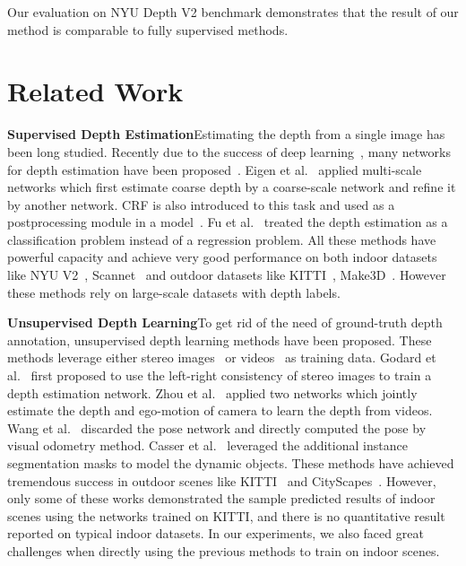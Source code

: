 \documentclass[10pt,twocolumn,letterpaper]{article}
\begin{document}
Our evaluation on NYU Depth V2 benchmark demonstrates that the result of our method is comparable to fully supervised methods. 

\section{Related Work}

\textbf{Supervised Depth Estimation}\quad Estimating the depth from a single image has been long studied. Recently due to the success of deep learning~\cite{li2019_internet,li2019_cmt}, many networks for depth estimation have been proposed~\cite{eigen2014depth,eigen2015predicting,li2017two,liu2014discrete,fu2018deep,laina2016deeper}. Eigen et al.~\cite{eigen2014depth} applied multi-scale networks which first estimate coarse depth by a coarse-scale network and refine it by another network. CRF is also introduced to this task and used as a postprocessing module in a model~\cite{xu2017multi}. Fu et al.~\cite{fu2018deep} treated the depth estimation as a classification problem instead of a regression problem. All these methods have powerful capacity and achieve very good performance on both indoor datasets like NYU V2~\cite{silberman2012indoor}, Scannet~\cite{dai2017scannet} and outdoor datasets like KITTI~\cite{geiger2012we}, Make3D~\cite{saxena2006learning,saxena2009make3d}. However these methods rely on large-scale datasets with depth labels.

\textbf{Unsupervised Depth Learning}\quad To get rid of the need of ground-truth depth annotation, unsupervised depth learning methods have been proposed. These methods leverage either stereo images~\cite{godard2017unsupervised,yang2018every} or videos~\cite{zhou2017unsupervised,yin2018geonet} as training data. Godard et al.~\cite{godard2017unsupervised} first proposed to use the left-right consistency of stereo images to train a depth estimation network. Zhou et al.~\cite{zhou2017unsupervised} applied two networks which jointly estimate the depth and ego-motion of camera to learn the depth from videos. Wang et al.~\cite{wang2018learning} discarded the pose network and directly computed the pose by visual odometry method. Casser et al.~\cite{casser2019struct2depth} leveraged the additional instance segmentation masks to model the dynamic objects. These methods have achieved tremendous success in outdoor scenes like KITTI~\cite{geiger2012we} and CityScapes~\cite{cordts2016cityscapes}. However, only some of these works demonstrated the sample predicted results of indoor scenes using the networks trained on KITTI, and there is no quantitative result reported on typical indoor datasets. In our experiments, we also faced great challenges when directly using the previous methods to train on indoor scenes.
\end{document}
